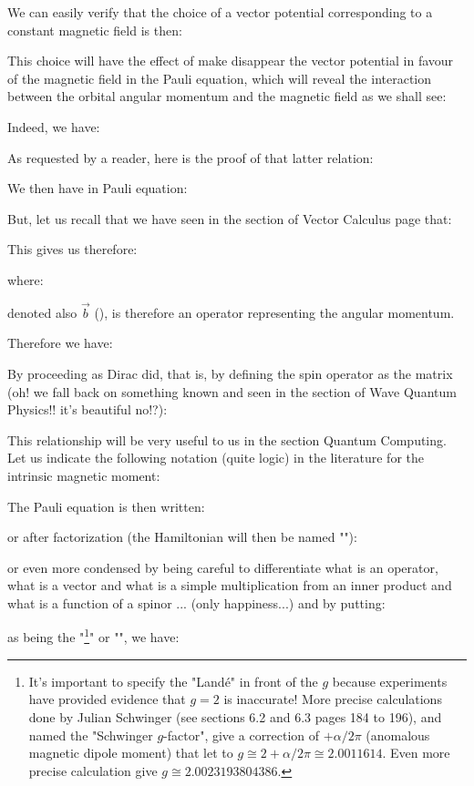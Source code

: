 	We can easily verify that the choice of a vector potential corresponding to a constant magnetic field is then:
	
	This choice will have the effect of make disappear the vector potential in favour of the magnetic field in the Pauli equation, which will reveal the interaction between the orbital angular momentum and the magnetic field as we shall see:

	Indeed, we have:
	
	As requested by a reader, here is the proof of that latter relation:
	
	We then have in Pauli equation:
	
	But, let us recall that we have seen in the section of Vector Calculus page \pageref{cross product} that:
	
	This gives us therefore:
	
	where:
	
	denoted also $\vec{b}$ (), is therefore an operator representing the angular momentum.

	Therefore we have:
	
	By proceeding as Dirac did, that is, by defining the spin operator as the matrix (oh! we fall back on something known and seen in the section of Wave Quantum Physics!! it's beautiful no!?)\label{emerging electron spin value}:
	
	This relationship will be very useful to us in the section Quantum Computing. Let us indicate the following notation (quite logic) in the literature for the intrinsic magnetic moment:
	
	The Pauli equation is then written:
	
	or after factorization (the Hamiltonian will then be named "\label{pauli hamiltonian for a constant direction magnetic field}"):
	
	or even more condensed by being careful to differentiate what is an operator, what is a vector and what is a simple multiplication from an inner product and what is a function of a spinor ... (only happiness...) and by putting:
	
	as being the "\footnote{It's important to specify the "Landé" in front of the $g$ because experiments have provided evidence that $g=2$ is inaccurate! More precise calculations done by Julian Schwinger (see \cite{peskin2018introduction} sections 6.2 and 6.3 pages 184 to 196), and named the "Schwinger $g$-factor", give a correction of $+\alpha/2\pi$ (anomalous magnetic dipole moment) that let to $g\cong 2+\alpha/2\pi\cong 2.0011614$. Even more precise calculation give $g\cong 2.0023193804386$.}" or "\label{gyromagnetic factor}", we have:
	
